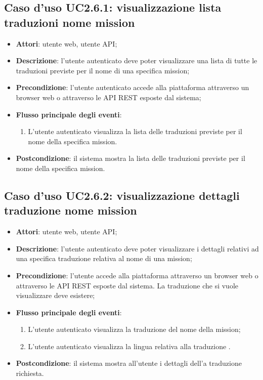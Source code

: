\subsection{Caso d'uso UC2.6.1: visualizzazione lista traduzioni nome mission}
\begin{itemize}
\item \textbf{Attori}: utente web, utente API;
\item \textbf{Descrizione}: l'utente autenticato deve poter visualizzare una lista di tutte le traduzioni previste per il nome di una specifica mission; 
      \item \textbf{Precondizione}: l'utente autenticato accede alla piattaforma attraverso un browser web o attraverso le API REST esposte dal sistema;

        \item \textbf{Flusso principale degli eventi}:
          \begin{enumerate}
          \item L'utente autenticato visualizza la lista delle traduzioni previste per il nome della specifica mission.

      \end{enumerate}
    \item \textbf{Postcondizione}: il sistema mostra la lista delle traduzioni previste per il nome della specifica mission.
  \end{itemize}
\hypertarget{UC2.6.2}{}
\subsection{Caso d'uso UC2.6.2: visualizzazione dettagli traduzione nome mission}
\begin{itemize}
\item \textbf{Attori}: utente web, utente API;
\item \textbf{Descrizione}: l'utente autenticato deve poter visualizzare i dettagli relativi ad una specifica traduzione relativa al nome di una mission; 
      \item \textbf{Precondizione}: l'utente accede alla piattaforma attraverso un browser web o attraverso le API REST esposte dal sistema. La traduzione che si vuole visualizzare deve esistere;

        \item \textbf{Flusso principale degli eventi}:
          \begin{enumerate}
          \item L'utente autenticato visualizza la traduzione del nome della mission;
          \item L'utente autenticato visualizza la lingua relativa alla traduzione .

      \end{enumerate}
    \item \textbf{Postcondizione}: il sistema mostra all'utente i dettagli dell'a traduzione richiesta.
  \end{itemize}
\hypertarget{UC2.6.3}{}

